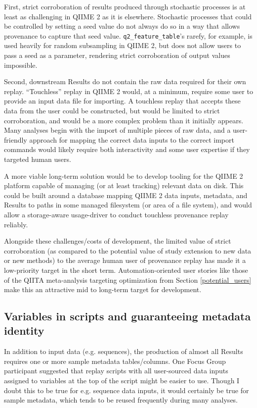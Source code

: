 First, strict corroboration of results produced through stochastic processes is
at least as challenging in QIIME 2 as it is elsewhere. Stochastic processes that
could be controlled by setting a seed value do not always do so in a way that
allows provenance to capture that seed value. \texttt{q2\_feature\_table}’s rarefy, for
example, is used heavily for random subsampling in QIIME 2, but does not allow
users to pass a seed as a parameter, rendering strict corroboration of output
values impossible.

Second, downstream Results do not contain the raw data required for their own
replay. “Touchless” replay in QIIME 2 would, at a minimum, require some user to
provide an input data file for importing. A touchless replay that accepts these
data from the user could be constructed, but would be limited to strict
corroboration, and would be a more complex problem than it initially appears.
Many analyses begin with the import of multiple pieces of raw data, and a
user-friendly approach for mapping the correct data inputs to the correct import
commands would likely require both interactivity and some user expertise if they
targeted human users.

A more viable long-term solution would be to develop tooling for the QIIME 2
platform capable of managing (or at least tracking) relevant data on disk. This
could be built around a database mapping QIIME 2 data inputs, metadata, and
Results to paths in some managed filesystem (or area of a file system), and
would allow a storage-aware usage-driver to conduct touchless provenance replay
reliably.

Alongside these challenges/costs of development, the limited value of strict
corroboration (as compared to the potential value of study extension to new data
or new methods) to the average human user of provenance replay has made it a
low-priority target in the short term. Automation-oriented user stories like
those of the QIITA meta-analysis targeting optimization from Section \ref{potential_users}
make this an attractive mid to long-term target for development.

\subsection{Variables in scripts and guaranteeing metadata identity \parencite[Issue 44]{keefe_issues_2021}}

In addition to input data (e.g. sequences), the production of almost all Results
requires one or more sample metadata tables/columns. One Focus Group participant
suggested that replay scripts with all user-sourced data inputs assigned to
variables at the top of the script might be easier to use. Though I doubt this
to be true for e.g. sequence data inputs, it would certainly be true for sample
metadata, which tends to be reused frequently during many analyses.

